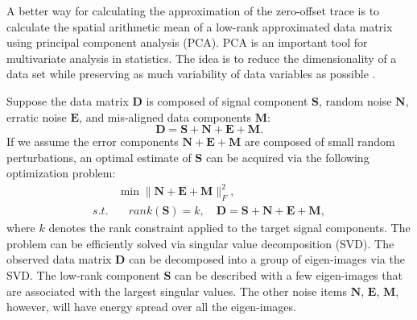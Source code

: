 A better way for calculating the approximation of the zero-offset trace is to calculate the spatial arithmetic mean of a low-rank approximated data matrix using principal component analysis (PCA). PCA is an important tool for multivariate analysis in statistics. The idea is to reduce the dimensionality
of a data set while preserving as much variability of data variables as possible \cite{jolliffe2010}.

Suppose the data matrix $\mathbf{D}$ is composed of signal component $\mathbf{S}$, random noise $\mathbf{N}$, erratic noise $\mathbf{E}$, and mis-aligned data components $\mathbf{M}$:
\begin{equation}
\label{eq:pca1}
\mathbf{D} = \mathbf{S} + \mathbf{N} + \mathbf{E} + \mathbf{M}.
\end{equation}
 If we assume the error components $ \mathbf{N} + \mathbf{E} + \mathbf{M}$ are composed of small random perturbations, an optimal estimate of $\mathbf{S}$ can be acquired via the following optimization problem:
 \begin{equation}
 \label{eq:pca2}
 \begin{split}
 &\min \parallel \mathbf{N} + \mathbf{E} + \mathbf{M} \parallel_F^2, \\
 s.t. &\quad rank(\mathbf{S})=k, \quad \mathbf{D} = \mathbf{S} + \mathbf{N} + \mathbf{E} + \mathbf{M},
 \end{split}
 \end{equation}
 where $k$ denotes the rank constraint applied to the target signal components. The problem can be efficiently solved via singular value decomposition (SVD).  The observed data matrix $\mathbf{D}$ can be decomposed into a group of eigen-images via the SVD. The low-rank component $\mathbf{S}$ can be described with a few eigen-images that are associated with the largest singular values. The other noise items $ \mathbf{N}$, $\mathbf{E}$, $\mathbf{M}$, however, will have energy spread over all the eigen-images.
 
